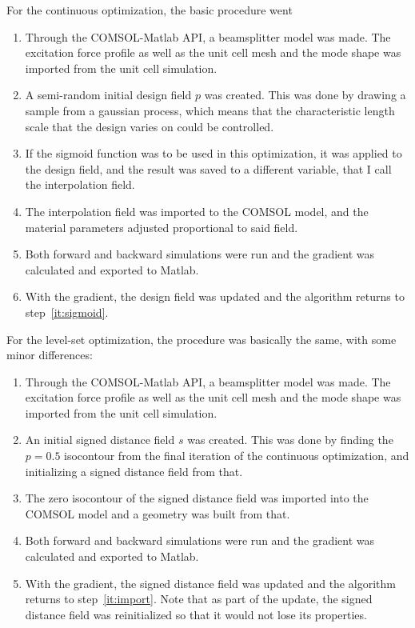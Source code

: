 For the continuous optimization, the basic procedure went
\begin{enumerate}
	\item Through the COMSOL-Matlab API, a beamsplitter model was made.
		The excitation force profile as well as the unit cell mesh and the mode
		shape was imported from the unit cell simulation.
	\item A semi-random initial design field $p$ was created. This was done by
		drawing a sample from a gaussian process, which means that the characteristic
		length scale that the design varies on could be controlled.
	\item\label{it:sigmoid} If the sigmoid function was to be used in this optimization, it was
		applied to the design field, and the result was saved to a different
		variable, that I call the interpolation field.
	\item The interpolation field was imported to the COMSOL model, and the
		material parameters adjusted proportional to said field.
	\item Both forward and backward simulations were run and the gradient was
		calculated and exported to Matlab.
	\item With the gradient, the design field was updated and the algorithm
		returns to step~\ref{it:sigmoid}.
\end{enumerate}

For the level-set optimization, the procedure was basically the same, with some
minor differences:
\begin{enumerate}
	\item Through the COMSOL-Matlab API, a beamsplitter model was made.
		The excitation force profile as well as the unit cell mesh and the mode
		shape was imported from the unit cell simulation.
	\item An initial signed distance field $s$ was created.
		This was done by finding the $p=0.5$ isocontour from the final iteration
		of the continuous optimization, and initializing a signed distance field
		from that.
	\item\label{it:import} The zero isocontour of the signed distance field was imported into
		the COMSOL model and a geometry was built from that.
	\item Both forward and backward simulations were run and the gradient was
		calculated and exported to Matlab.
	\item With the gradient, the signed distance field was updated and the algorithm
		returns to step~\ref{it:import}.
		Note that as part of the update, the signed distance field was
		reinitialized so that it would not lose its properties.
\end{enumerate}
